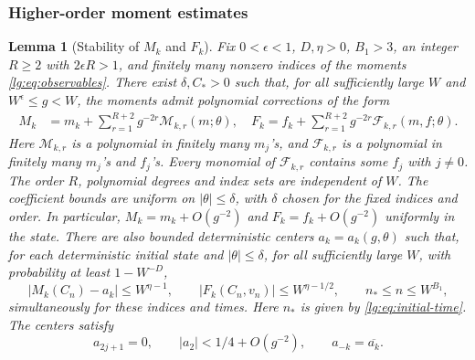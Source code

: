 \documentclass[11pt]{article}
\numberwithin{equation}{section}
\newtheorem{lemma}[theorem]{Lemma}
\theoremstyle{remark}
\begin{document}
\subsubsection{Higher-order moment estimates}
\label{lg:sec:general-state}

\begin{lemma}[Stability of $M_k$ and $F_k$]\label{lg:lem:dynamic}
Fix $0<\epsilon<1$, $D,\eta>0$, $B_1>3$, an integer $R\ge2$ with
$2\epsilon R>1$, and finitely many nonzero indices of the moments
\eqref{lg:eq:observables}. There exist $\delta,C_*>0$ such that,
for all sufficiently large $W$ and $W^\epsilon\le g<W$, the moments admit
polynomial corrections of the form
\[
 \begin{aligned}
 M_k&=m_k+\sum_{r=1}^{R+2}g^{-2r}\mathcal M_{k,r}(m;\theta), \quad 
 F_k =f_k+\sum_{r=1}^{R+2}g^{-2r}\mathcal F_{k,r}(m,f;\theta).
 \end{aligned}
\]
Here $\mathcal M_{k,r}$ is a polynomial in finitely many $m_j$'s,
and $\mathcal F_{k,r}$ is a polynomial in finitely many $m_j$'s and
$f_j$'s. Every monomial of $\mathcal F_{k,r}$ contains some $f_j$
with $j\ne0$.
The order $R$, polynomial degrees and index sets are independent of $W$.
The coefficient bounds are uniform on $|\theta|\le\delta$, with $\delta$ chosen for the fixed indices and order. In particular, $M_k=m_k+O(g^{-2})$ and
$F_k=f_k+O(g^{-2})$ uniformly in the state.
There are also bounded deterministic centers $a_k=a_k(g,\theta)$
such that, for each deterministic initial state and $|\theta|\le\delta$,
for all sufficiently large $W$, with probability at least
$1-W^{-D}$,
\begin{equation}\label{lg:eq:burnevent}
 |M_k(C_n)-a_k|\le W^{\eta-1},\qquad
 |F_k(C_n,v_n)|\le W^{\eta-1/2},
 \qquad n_*\le n\le W^{B_1},
\end{equation}
simultaneously for these indices and times. Here
$n_*$ is given by \eqref{lg:eq:initial-time}. The centers satisfy
\[
 a_{2j+1}=0,\qquad |a_2|<1/4+O(g^{-2}),\qquad
 a_{-k}=\overline{a_k}.
\]
\end{lemma}
\end{document}
